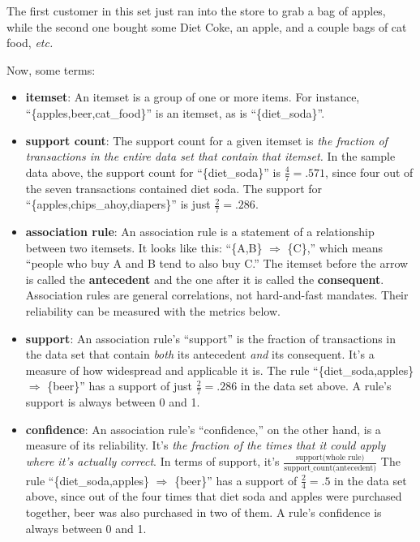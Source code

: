 The first customer in this set just ran into the store to grab a bag of
apples, while the second one bought some Diet Coke, an apple, and a couple
bags of cat food, \textit{etc.}

\vspace{.1in}
Now, some terms:

\begin{itemize}
\itemsep.1em

\item \textbf{itemset}: An itemset is a group of one or more items. For
instance, ``\{apples,beer,cat\_food\}'' is an itemset, as is
``\{diet\_soda\}''.

\item \textbf{support count}: The support count for a given itemset is
\textit{the fraction of transactions in the entire data set that contain that
itemset.} In the sample data above, the support count for ``\{diet\_soda\}'' is
$\frac{4}{7} = .571$, since four out of the seven transactions contained
diet soda. The support for ``\{apples,chips\_ahoy,diapers\}'' is just $\frac{2}{7}
= .286$.

\item \textbf{association rule}: An association rule is a statement of a
relationship between two itemsets. It looks like this: ``\{A,B\} $\Rightarrow$
\{C\},'' which means ``people who buy A and B tend to also buy C.'' The itemset
before the arrow is called the \textbf{antecedent} and the one after it is
called the \textbf{consequent}. Association
rules are general correlations, not hard-and-fast mandates. Their reliability
can be measured with the metrics below.

\item \textbf{support}: An association rule's ``support'' is the fraction of
transactions in the data set that contain \textit{both} its antecedent
\textit{and} its consequent. It's a measure of how widespread and applicable
it is. The rule ``\{diet\_soda,apples\} $\Rightarrow$ \{beer\}'' has a support of
just $\frac{2}{7} = .286$ in the data set above. A rule's support is always
between 0 and 1.

\item \textbf{confidence}: An association rule's ``confidence,'' on the other
hand, is a measure of its reliability. It's \textit{the fraction of the times
that it could apply where it's actually correct}. In terms of support, it's
$\frac{\textrm{support(whole rule)}}{\textrm{support\_count(antecedent)}}$
The rule ``\{diet\_soda,apples\} $\Rightarrow$ \{beer\}'' has a support of
$\frac{2}{4} = .5$ in the data set above, since out of the four times that
diet soda and apples were purchased together, beer was also purchased in two
of them. A rule's confidence is always between 0 and 1.


\end{itemize}
